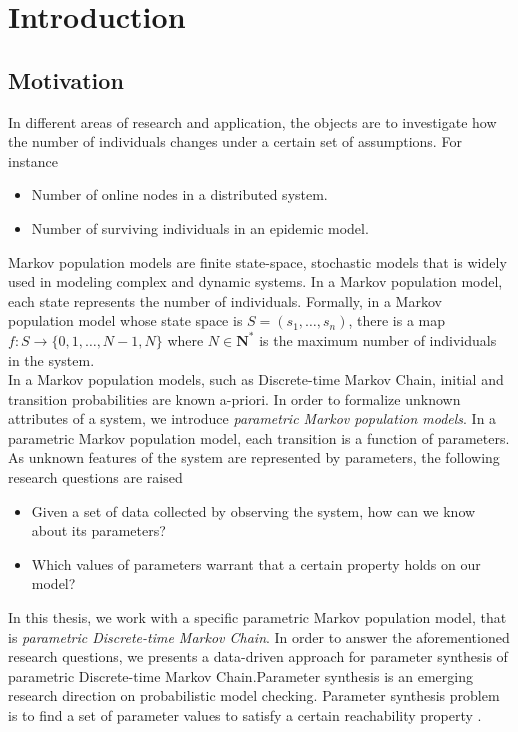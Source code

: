 \chapter{Introduction}
\section{Motivation}

In different areas of research and application, the objects are to investigate how the number of individuals changes under a certain set of assumptions. For instance
\begin{itemize}
      \item Number of online nodes in a distributed system.
      \item Number of surviving individuals in an epidemic model.
\end{itemize}
Markov population models \cite{kingman1969markov} are finite state-space, stochastic models that is widely used in modeling complex and dynamic systems. In a Markov population model, each state represents the number of individuals. Formally, in a Markov population model whose state space is $S=(s_1,\ldots,s_n)$, there is a map $f:S\rightarrow\{0,1,\ldots,N-1,N\}$ where $N\in\mathbf{N}^*$ is the maximum number of individuals in the system.\\
In a Markov population models, such as Discrete-time Markov Chain, initial and transition probabilities are known a-priori. In order to formalize unknown attributes of a system, we introduce \textit{parametric Markov population models}. In a parametric Markov population model, each transition is a function of parameters. As unknown features of the system are represented by parameters, the following research questions are raised
\begin{itemize}
      \item Given a set of data collected by observing the system, how can we know about its parameters?
      \item Which values of parameters warrant that a certain property holds on our model?
\end{itemize}
In this thesis, we work with a specific parametric Markov population model, that is \textit{parametric Discrete-time Markov Chain}. In order to answer the aforementioned research questions, we presents a data-driven approach for parameter synthesis of parametric Discrete-time Markov Chain.Parameter synthesis is an emerging research direction on probabilistic model checking. Parameter synthesis problem is to find a set of parameter values to satisfy a certain reachability property \cite{katoen2016probabilistic}.


